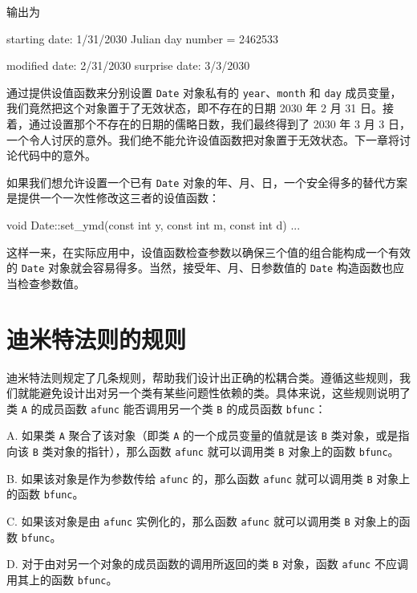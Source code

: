 输出为

\begin{codebox}
starting date: 1/31/2030
Julian day number = 2462533

modified date: 2/31/2030
surprise date: 3/3/2030
\end{codebox}

通过提供设值函数来分别设置 \texttt{Date} 对象私有的 \texttt{year}、\texttt{month} 和 \texttt{day} 成员变量，我们竟然把这个对象置于了无效状态，即不存在的日期 2030 年 2 月 31 日。接着，通过设置那个不存在的日期的儒略日数，我们最终得到了 2030 年 3 月 3 日，一个令人讨厌的意外。我们绝不能允许设值函数把对象置于无效状态。下一章将讨论代码中的意外。


如果我们想允许设置一个已有 \texttt{Date} 对象的年、月、日，一个安全得多的替代方案是提供一个一次性修改这三者的设值函数：

\begin{codebox}
void Date::set_ymd(const int y, const int m, const int d)
{
    ...
}
\end{codebox}

这样一来，在实际应用中，设值函数检查参数以确保三个值的组合能构成一个有效的 \texttt{Date} 对象就会容易得多。当然，接受年、月、日参数值的 \texttt{Date} 构造函数也应当检查参数值。

\section{迪米特法则的规则}

迪米特法则规定了几条规则，帮助我们设计出正确的松耦合类。遵循这些规则，我们就能避免设计出对另一个类有某些问题性依赖的类。具体来说，这些规则说明了类 \texttt{A} 的成员函数 \texttt{afunc} 能否调用另一个类 \texttt{B} 的成员函数 \texttt{bfunc}：

A. 如果类 \texttt{A} 聚合了该对象（即类 \texttt{A} 的一个成员变量的值就是该 \texttt{B} 类对象，或是指向该 \texttt{B} 类对象的指针），那么函数 \texttt{afunc} 就可以调用类 \texttt{B} 对象上的函数 \texttt{bfunc}。

B. 如果该对象是作为参数传给 \texttt{afunc} 的，那么函数 \texttt{afunc} 就可以调用类 \texttt{B} 对象上的函数 \texttt{bfunc}。

C. 如果该对象是由 \texttt{afunc} 实例化的，那么函数 \texttt{afunc} 就可以调用类 \texttt{B} 对象上的函数 \texttt{bfunc}。

D. 对于由对另一个对象的成员函数的调用所返回的类 \texttt{B} 对象，函数 \texttt{afunc} 不应调用其上的函数 \texttt{bfunc}。

